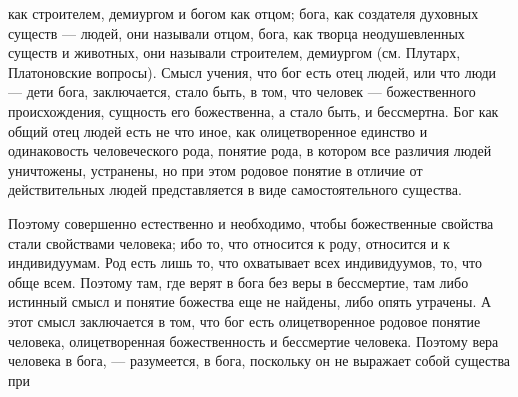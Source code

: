 \documentclass[12pt]{article}
\begin{document}
как строителем, демиургом и богом как отцом; бога, как создателя духовных существ --- людей, они называли отцом, бога, как творца неодушевленных существ и животных, они называли строителем, демиургом (см. Плутарх, Платоновские вопросы). Смысл учения, что бог есть отец людей, или что люди --- дети бога, заключается, стало быть, в том, что человек --- божественного происхождения, сущность его божественна, а стало быть, и бессмертна. Бог как общий отец людей есть не что иное, как олицетворенное единство и одинаковость человеческого рода, понятие рода, в котором все различия людей уничтожены, устранены, но при этом родовое понятие в отличие от действительных людей представляется в виде самостоятельного существа. 

Поэтому совершенно естественно и необходимо, чтобы божественные свойства стали свойствами человека; ибо то, что относится к роду, относится и к индивидуумам. Род есть лишь то, что охватывает всех индивидуумов, то, что обще всем. Поэтому там, где верят в бога без веры в бессмертие, там либо истинный смысл и понятие божества еще не найдены, либо опять утрачены. А этот смысл заключается в том, что бог есть олицетворенное родовое понятие человека, олицетворенная божественность и бессмертие человека. Поэтому вера человека в бога, --- разумеется, в бога, поскольку он не выражает собой существа при 
\end{document}
